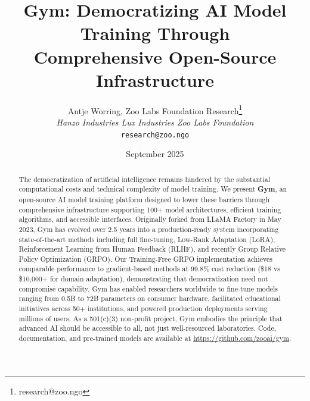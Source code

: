 \documentclass[11pt,letterpaper]{article}
\title{Gym: Democratizing AI Model Training Through\\Comprehensive Open-Source Infrastructure}
\author{
Antje Worring, Zoo Labs Foundation Research\thanks{research@zoo.ngo}\\
\textit{Hanzo Industries \quad Lux Industries \quad Zoo Labs Foundation}\\
\texttt{research@zoo.ngo}
}
\date{September 2025}
\begin{document}
\zoocoverpage

\begin{abstract}
The democratization of artificial intelligence remains hindered by the substantial computational costs and technical complexity of model training. We present \textbf{Gym}, an open-source AI model training platform designed to lower these barriers through comprehensive infrastructure supporting 100+ model architectures, efficient training algorithms, and accessible interfaces. Originally forked from LLaMA Factory in May 2023, Gym has evolved over 2.5 years into a production-ready system incorporating state-of-the-art methods including full fine-tuning, Low-Rank Adaptation (LoRA), Reinforcement Learning from Human Feedback (RLHF), and recently Group Relative Policy Optimization (GRPO). Our Training-Free GRPO implementation achieves comparable performance to gradient-based methods at 99.8\% cost reduction (\$18 vs \$10,000+ for domain adaptation), demonstrating that democratization need not compromise capability. Gym has enabled researchers worldwide to fine-tune models ranging from 0.5B to 72B parameters on consumer hardware, facilitated educational initiatives across 50+ institutions, and powered production deployments serving millions of users. As a 501(c)(3) non-profit project, Gym embodies the principle that advanced AI should be accessible to all, not just well-resourced laboratories. Code, documentation, and pre-trained models are available at \url{https://github.com/zooai/gym}.
\end{abstract}















\end{document}
